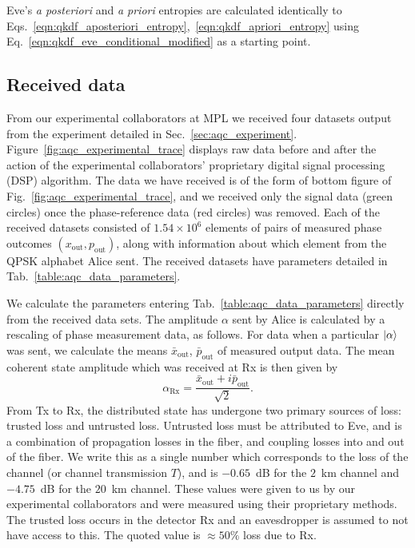 Eve's \emph{a posteriori} and \emph{a priori} entropies are calculated identically to Eqs.~\ref{eqn:qkdf_aposteriori_entropy},~\ref{eqn:qkdf_apriori_entropy} using Eq.~\ref{eqn:qkdf_eve_conditional_modified} as a starting point.


\subsection{Received data}\label{sec:aqc_received_data}
From our experimental collaborators at MPL we received four datasets output from the experiment detailed in Sec.~\ref{sec:aqc_experiment}. Figure~\ref{fig:aqc_experimental_trace} displays raw data before and after the action of the experimental collaborators' proprietary digital signal processing (DSP) algorithm. The data we have received is of the form of bottom figure of Fig.~\ref{fig:aqc_experimental_trace}, and we received only the signal data (green circles) once the phase-reference data (red circles) was removed. Each of the received datasets consisted of $1.54\times10^6$ elements of pairs of measured phase outcomes $\left(x_{\text{out}}, p_{\text{out}}\right)$, along with information about which element from the QPSK alphabet Alice sent. The received datasets have parameters detailed in Tab.~\ref{table:aqc_data_parameters}.



We calculate the parameters entering Tab.~\ref{table:aqc_data_parameters} directly from the received data sets. The amplitude $\alpha$ sent by Alice is calculated by a rescaling of phase measurement data, as follows. For data when a particular $\ket{\alpha}$ was sent, we calculate the means $\bar{x}_{\text{out}}$, $\bar{p}_{\text{out}}$ of measured output data. The mean coherent state amplitude which was received at Rx is then given by 
\begin{equation}
\alpha_{\text{Rx}} = \frac{\bar{x}_{\text{out}} + i \bar{p}_{\text{out}}}{\sqrt{2}}.
\end{equation}
From Tx to Rx, the distributed state has undergone two primary sources of loss: trusted loss and untrusted loss. Untrusted loss must be attributed to Eve, and is a combination of propagation losses in the fiber, and coupling losses into and out of the fiber. We write this as a single number which corresponds to the loss of the channel (or channel transmission $T$), and is $-0.65$~dB for the $2$~km channel and $-4.75$~dB for the $20$~km channel. These values were given to us by our experimental collaborators and were measured using their proprietary methods. The trusted loss occurs in the detector Rx and an eavesdropper is assumed to not have access to this. The quoted value is $\approx 50\%$ loss due to Rx.

